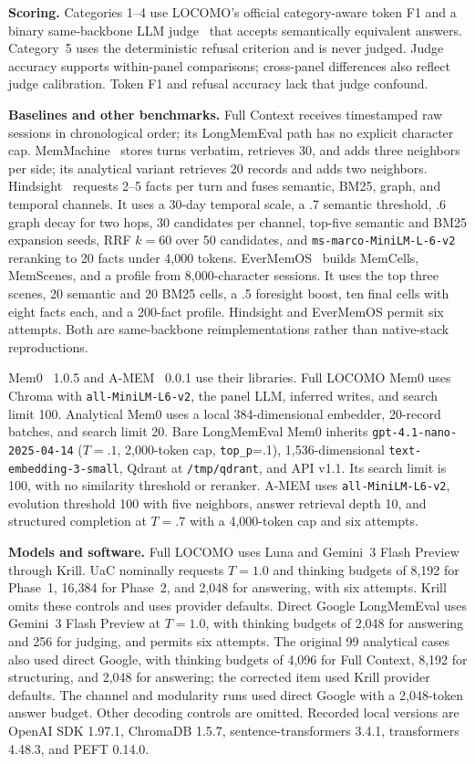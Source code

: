 \documentclass[letterpaper]{article} %
\begin{document}
\textbf{Scoring.} Categories 1--4 use LOCOMO's official category-aware token F1 and a binary same-backbone LLM judge~\citep{zheng2023mtbench} that accepts semantically equivalent answers. Category~5 uses the deterministic refusal criterion and is never judged. Judge accuracy supports within-panel comparisons; cross-panel differences also reflect judge calibration. Token F1 and refusal accuracy lack that judge confound.

\textbf{Baselines and other benchmarks.} Full Context receives timestamped raw sessions in chronological order; its LongMemEval path has no explicit character cap. MemMachine~\citep{wang2026memmachine} stores turns verbatim, retrieves 30, and adds three neighbors per side; its analytical variant retrieves 20 records and adds two neighbors. Hindsight~\citep{latimer2025hindsight} requests 2--5 facts per turn and fuses semantic, BM25, graph, and temporal channels. It uses a 30-day temporal scale, a .7 semantic threshold, .6 graph decay for two hops, 30 candidates per channel, top-five semantic and BM25 expansion seeds, RRF $k{=}60$ over 50 candidates, and \texttt{ms-marco-MiniLM-L-6-v2} reranking to 20 facts under 4,000 tokens. EverMemOS~\citep{hu2026evermemos} builds MemCells, MemScenes, and a profile from 8,000-character sessions. It uses the top three scenes, 20 semantic and 20 BM25 cells, a .5 foresight boost, ten final cells with eight facts each, and a 200-fact profile. Hindsight and EverMemOS permit six attempts. Both are same-backbone reimplementations rather than native-stack reproductions.

Mem0~\citep{chhikara2025mem0} 1.0.5 and A-MEM~\citep{xu2025amem} 0.0.1 use their libraries. Full LOCOMO Mem0 uses Chroma with \texttt{all-MiniLM-L6-v2}, the panel LLM, inferred writes, and search limit 100. Analytical Mem0 uses a local 384-dimensional embedder, 20-record batches, and search limit 20. Bare LongMemEval Mem0 inherits \texttt{gpt-4.1-nano-2025-04-14} ($T=.1$, 2,000-token cap, \texttt{top\_p}=.1), 1,536-dimensional \texttt{text-embedding-3-small}, Qdrant at \texttt{/tmp/qdrant}, and API v1.1. Its search limit is 100, with no similarity threshold or reranker. A-MEM uses \texttt{all-MiniLM-L6-v2}, evolution threshold 100 with five neighbors, answer retrieval depth 10, and structured completion at $T=.7$ with a 4,000-token cap and six attempts.

\textbf{Models and software.} Full LOCOMO uses Luna and Gemini~3 Flash Preview through Krill. UaC nominally requests $T=1.0$ and thinking budgets of 8,192 for Phase~1, 16,384 for Phase~2, and 2,048 for answering, with six attempts. Krill omits these controls and uses provider defaults. Direct Google LongMemEval uses Gemini~3 Flash Preview at $T=1.0$, with thinking budgets of 2,048 for answering and 256 for judging, and permits six attempts. The original 99 analytical cases also used direct Google, with thinking budgets of 4,096 for Full Context, 8,192 for structuring, and 2,048 for answering; the corrected item used Krill provider defaults. The channel and modularity runs used direct Google with a 2,048-token answer budget. Other decoding controls are omitted. Recorded local versions are OpenAI SDK 1.97.1, ChromaDB 1.5.7, sentence-transformers 3.4.1, transformers 4.48.3, and PEFT 0.14.0.
\end{document}
